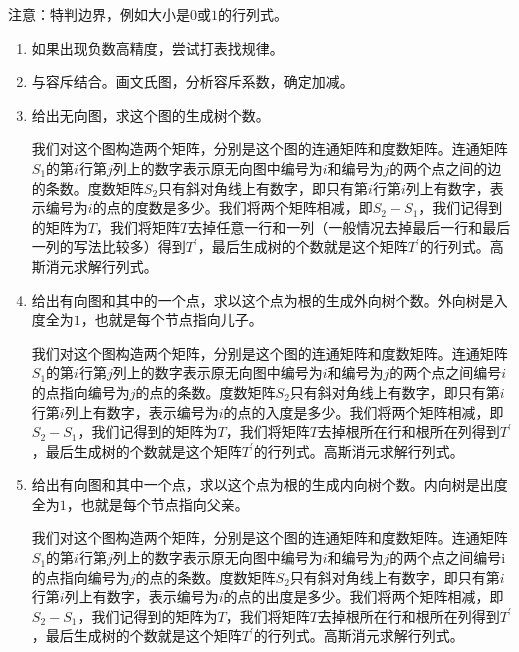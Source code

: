 \documentclass[E:/GsjzTle/main/main.tex]{subfiles}
\begin{document}
注意：特判边界，例如大小是$0$或$1$的行列式。


\begin{enumerate}
\item  如果出现负数高精度，尝试打表找规律。
	
\item  与容斥结合。画文氏图，分析容斥系数，确定加减。

\item  给出无向图，求这个图的生成树个数。

我们对这个图构造两个矩阵，分别是这个图的连通矩阵和度数矩阵。连通矩阵$S_1$的第$i$行第$j$列上的数字表示原无向图中编号为$i$和编号为$j$的两个点之间的边的条数。度数矩阵$S_2$只有斜对角线上有数字，即只有第$i$行第$i$列上有数字，表示编号为$i$的点的度数是多少。我们将两个矩阵相减，即$S_2−S_1$，我们记得到的矩阵为$T$，我们将矩阵$T$去掉任意一行和一列（一般情况去掉最后一行和最后一列的写法比较多）得到$T^{'}$，最后生成树的个数就是这个矩阵$T^{'}$的行列式。高斯消元求解行列式。


\item  给出有向图和其中的一个点，求以这个点为根的生成外向树个数。外向树是入度全为$1$，也就是每个节点指向儿子。

我们对这个图构造两个矩阵，分别是这个图的连通矩阵和度数矩阵。连通矩阵$S_1$的第$i$行第$j$列上的数字表示原无向图中编号为$i$和编号为$j$的两个点之间编号$i$的点指向编号为$j$的点的条数。度数矩阵$S_2$只有斜对角线上有数字，即只有第$i$行第$i$列上有数字，表示编号为$i$的点的入度是多少。我们将两个矩阵相减，即$S_2−S_1$，我们记得到的矩阵为$T$，我们将矩阵$T$去掉根所在行和根所在列得到$T^{'}$，最后生成树的个数就是这个矩阵$T^{'}$的行列式。高斯消元求解行列式。

\item  给出有向图和其中一个点，求以这个点为根的生成内向树个数。内向树是出度全为$1$，也就是每个节点指向父亲。

我们对这个图构造两个矩阵，分别是这个图的连通矩阵和度数矩阵。连通矩阵$S_1$的第$i$行第$j$列上的数字表示原无向图中编号为$i$和编号为$j$的两个点之间编号i的点指向编号为$j$的点的条数。度数矩阵$S_2$只有斜对角线上有数字，即只有第$i$行第$i$列上有数字，表示编号为$i$的点的出度是多少。我们将两个矩阵相减，即$S_2−S_1$，我们记得到的矩阵为$T$，我们将矩阵$T$去掉根所在行和根所在列得到$T^{'}$，最后生成树的个数就是这个矩阵$T^{'}$的行列式。高斯消元求解行列式。
\end{enumerate}
\end{document}
